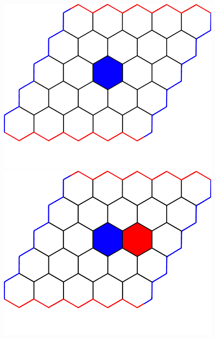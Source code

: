 \documentclass[a4paper]{article}
\begin{document}
\begin{figure}[t]
    \begin{minipage}[t]{.24\linewidth}
    \includegraphics[width=\linewidth]{figures/example_game/ex_game_t1.png}
    \end{minipage}
    \begin{minipage}[t]{.24\linewidth}
    \includegraphics[width=\linewidth]{figures/example_game/ex_game_t2.png}
    \end{minipage}
    \begin{minipage}[t]{.24\linewidth}

\end{minipage}
\end{figure}
\end{document}
